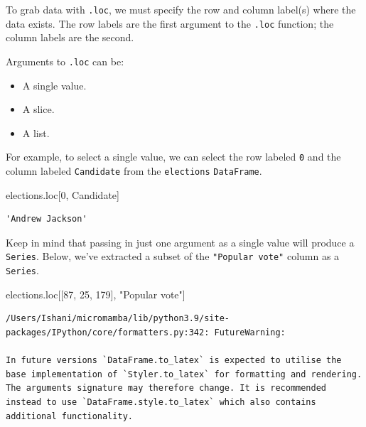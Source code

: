 \documentclass[
  letterpaper,
  DIV=11,
  numbers=noendperiod]{scrreprt}
\newenvironment{Shaded}{\begin{snugshade}}{\end{snugshade}}
\newcommand{\DecValTok}[1]{\textcolor[rgb]{0.68,0.00,0.00}{#1}}
\newcommand{\NormalTok}[1]{\textcolor[rgb]{0.00,0.23,0.31}{#1}}
\newcommand{\StringTok}[1]{\textcolor[rgb]{0.13,0.47,0.30}{#1}}
\providecommand{\tightlist}{%
  \setlength{\itemsep}{0pt}\setlength{\parskip}{0pt}}\usepackage{longtable,booktabs,array}
\begin{document}
To grab data with \texttt{.loc}, we must specify the row and column
label(s) where the data exists. The row labels are the first argument to
the \texttt{.loc} function; the column labels are the second.

Arguments to \texttt{.loc} can be:

\begin{itemize}
\tightlist
\item
  A single value.
\item
  A slice.
\item
  A list.
\end{itemize}

For example, to select a single value, we can select the row labeled
\texttt{0} and the column labeled \texttt{Candidate} from the
\texttt{elections} \texttt{DataFrame}.

\begin{Shaded}
\begin{Highlighting}[]
\NormalTok{elections.loc[}\DecValTok{0}\NormalTok{, }\StringTok{\textquotesingle{}Candidate\textquotesingle{}}\NormalTok{]}
\end{Highlighting}
\end{Shaded}

\begin{verbatim}
'Andrew Jackson'
\end{verbatim}

Keep in mind that passing in just one argument as a single value will
produce a \texttt{Series}. Below, we've extracted a subset of the
\texttt{"Popular\ vote"} column as a \texttt{Series}.

\begin{Shaded}
\begin{Highlighting}[]
\NormalTok{elections.loc[[}\DecValTok{87}\NormalTok{, }\DecValTok{25}\NormalTok{, }\DecValTok{179}\NormalTok{], }\StringTok{"Popular vote"}\NormalTok{]}
\end{Highlighting}
\end{Shaded}

\begin{verbatim}
/Users/Ishani/micromamba/lib/python3.9/site-packages/IPython/core/formatters.py:342: FutureWarning:

In future versions `DataFrame.to_latex` is expected to utilise the base implementation of `Styler.to_latex` for formatting and rendering. The arguments signature may therefore change. It is recommended instead to use `DataFrame.style.to_latex` which also contains additional functionality.
\end{verbatim}
\end{document}
